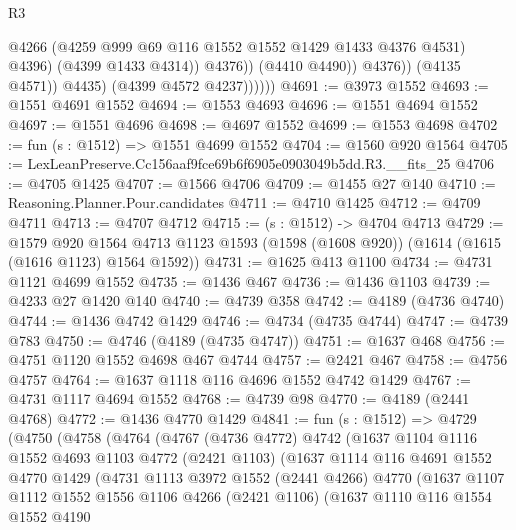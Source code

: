 \begin{lexlean}{R3}
\begin{coremodule}
                                @4266
                                (@4259 @999 @69 @116 @1552 @1552 @1429 @1433 @4376 @4531)
                                @4396)
                              (@4399 @1433 @4314))
                            @4376))
                        (@4410 @4490))
                      @4376))
                  (@4135 @4571))
                @4435)
              (@4399 @4572 @4237))))))
@4691 := @3973 @1552
@4693 := @1551 @4691 @1552
@4694 := @1553 @4693
@4696 := @1551 @4694 @1552
@4697 := @1551 @4696
@4698 := @4697 @1552
@4699 := @1553 @4698
@4702 := fun (s : @1512) => @1551 @4699 @1552
@4704 := @1560 @920 @1564
@4705 := LexLeanPreserve.Cc156aaf9fce69b6f6905e0903049b5dd.R3.__fits_25
@4706 := @4705 @1425
@4707 := @1566 @4706
@4709 := @1455 @27 @140
@4710 := Reasoning.Planner.Pour.candidates
@4711 := @4710 @1425
@4712 := @4709 @4711
@4713 := @4707 @4712
@4715 := (s : @1512) -> @4704 @4713
@4729 := @1579
    @920
    @1564
    @4713
    @1123
    @1593
    (@1598 (@1608 @920))
    (@1614 (@1615 (@1616 @1123) @1564 @1592))
@4731 := @1625 @413 @1100
@4734 := @4731 @1121 @4699 @1552
@4735 := @1436 @467
@4736 := @1436 @1103
@4739 := @4233 @27 @1420 @140
@4740 := @4739 @358
@4742 := @4189 (@4736 @4740)
@4744 := @1436 @4742 @1429
@4746 := @4734 (@4735 @4744)
@4747 := @4739 @783
@4750 := @4746 (@4189 (@4735 @4747))
@4751 := @1637 @468
@4756 := @4751 @1120 @1552 @4698 @467 @4744
@4757 := @2421 @467
@4758 := @4756 @4757
@4764 := @1637 @1118 @116 @4696 @1552 @4742 @1429
@4767 := @4731 @1117 @4694 @1552
@4768 := @4739 @98
@4770 := @4189 (@2441 @4768)
@4772 := @1436 @4770 @1429
@4841 := fun (s : @1512) =>
  @4729
    (@4750
      (@4758
        (@4764
          (@4767
            (@4736 @4772)
            @4742
            (@1637
              @1104
              @1116
              @1552
              @4693
              @1103
              @4772
              (@2421 @1103)
              (@1637
                @1114
                @116
                @4691
                @1552
                @4770
                @1429
                (@4731
                  @1113
                  @3972
                  @1552
                  (@2441 @4266)
                  @4770
                  (@1637
                    @1107
                    @1112
                    @1552
                    @1556
                    @1106
                    @4266
                    (@2421 @1106)
                    (@1637
                      @1110
                      @116
                      @1554
                      @1552
                      @4190

\end{coremodule}
\end{lexlean}
